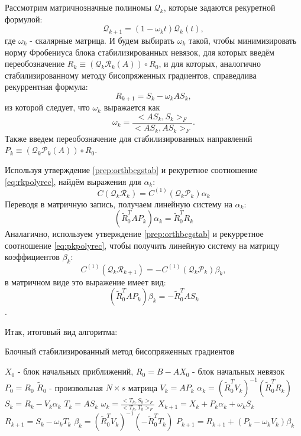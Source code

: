 Рассмотрим матричнозначные полиномы $\mathcal{Q}_k$, которые задаются рекуретной формулой:
\begin{equation*}
    \mathcal{Q}_{k+1} = (1-\omega_k t)\mathcal{Q}_k(t),
\end{equation*}
где $\omega_k$ - скалярные матрица. И будем выбирать $\omega_k$ такой, чтобы минимизировать норму 
Фробениуса блока стабилизированных невязок, для которых введём переобозначение $R_{k} \equiv (\mathcal{Q}_k\mathcal{R}_k(A)) \circ R_0$, и для которых, аналогично стабилизированному методу бисопряженных градиентов, справедлива рекуррентная формула:
$$R_{k+1} =  S_k - \omega_k A S_k,$$
из которой следует, что $\omega_k$ выражается как
 $$\omega_k = \frac{<AS_k,S_k>_F}{<AS_k,AS_k>_F}.$$
Также введем переобозначение для стабилизированных направлений $P_k \equiv (\mathcal{Q}_k \mathcal{P}_k (A)) \circ R_0$.


Используя утверждение \ref{prep:orthbcgstab} и рекуретное соотношение \eqref{eq:rkpolyrec}, 
найдём выражения для $\alpha_k$:
$$C(\mathcal{Q}_k \mathcal{R}_k) = C^{(1)}(\mathcal{Q}_k\mathcal{P}_k)\alpha_k $$
Переводя в матричную запись, получаем линейную систему на $\alpha_k$:
$$(\tilde{R}_0^T AP_k)\alpha_k = \tilde{R}_0^TR_k$$
Аналагично, используем утверждение \ref{prep:orthbcgstab} и рекурретное соотношение \eqref{eq:pkpolyrec}, чтобы получить линейную систему на матрицу коэффициентов $\beta_k$:
$$C^{(1)}(\mathcal{Q}_k\mathcal{R}_{k+1}) = - C^{(1)}(\mathcal{Q}_k \mathcal{P}_k)\beta_k,$$
в матричном виде это выражение имеет вид:
$$(\tilde{R}_0^T A P_k)\beta_k=-\tilde{R}_0^T A S_k$$.

Итак, итоговый вид алгоритма:
\begin{algorithm}
    \caption{Блочный стабилизированный метод бисопряженных градиентов}
    \begin{algorithmic}[1]
        \State $X_0$ - блок начальных приближений, $R_0 = B - AX_0$ - блок начальных невязок
        \State $P_0 = R_0$
        \State $\tilde{R}_0$ - произвольная $N \times s$ матрица
            \State $V_k = AP_k$
            \State $\alpha_k = (\tilde{R}_0^TV_k)^{-1}(\tilde{R}_0^T R_k)$
            \State $S_k = R_k - V_k \alpha_k$
            \State $T_k = A S_k$
            \State $\omega_k = \frac{<T_k,S_k>_F}{<T_k,T_k>_F}$
            \State $X_{k+1} = X_k + P_k \alpha_k + \omega_k S_k$
            \State $R_{k+1} = S_{k} - \omega_k T_k$
            \State $\beta_k = (\tilde{R}_0^T V_k)^{-1}(-\tilde{R}_0^T T_k)$
            \State $P_{k+1} = R_{k+1} + (P_k-\omega_kV_k)\beta_k$
        \EndFor
    \end{algorithmic}
\end{algorithm}

